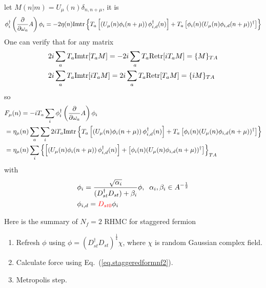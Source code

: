let $M(n|m)=U_{\mu}(n) \delta _{n,n+\mu}$, it is
\begin{equation}
\begin{split}
&\phi _i^{\dagger}\left(\frac{\partial }{\partial \omega _a}A\right)\phi _i = -2\eta (n) {\rm Imtr}\left\{T_a  \left[\left(U_{\mu}(n)\phi _i(n+\mu)\right)\phi _{i,d}^{\dagger}(n)\right]+T_a \left[\phi _i(n)(U_{\mu}(n)\phi _{i,d}(n+\mu))^{\dagger}\right]\right\}\\
\end{split}
\end{equation}
One can verify that for any matrix \textcolor[rgb]{0,0,1}{
\begin{equation}
\begin{split}
&2i \sum _a T_a {\rm Im tr}[T_a M] = -2 i \sum _a T_a {\rm Re tr}[i T_a M] = \{M\}_{TA}\\
&2i \sum _a T_a {\rm Im tr}[i T_a M] = 2 i \sum _a T_a {\rm Re tr}[T_a M] = \{i M\}_{TA}\\
\end{split}
\end{equation}
}
so
\begin{equation}
\begin{split}
&F_{\mu}(n)=-iT_a \sum _i \phi _{i}^{\dagger} \left(\frac{\partial }{\partial \omega _a} A \right) \phi _{i}\\
&=\eta _{\mu}(n) \sum _a \sum _i 2i T_a{\rm Imtr}\left\{T_a  \left[\left(U_{\mu}(n)\phi _i(n+\mu)\right)\phi _{i,d}^{\dagger}(n)\right]+T_a \left[\phi _i(n)(U_{\mu}(n)\phi _{i,d}(n+\mu))^{\dagger}\right]\right\}\\
&=\eta _{\mu}(n) \sum _i \left\{\left[\left(U_{\mu}(n)\phi _i(n+\mu)\right)\phi _{i,d}^{\dagger}(n)\right]+\left[\phi _i(n)(U_{\mu}(n)\phi _{i,d}(n+\mu))^{\dagger}\right]\right\}_{TA}
\end{split}
\label{eq.staggeredformnf2}
\end{equation}
with
\begin{equation}
\begin{split}
&\phi _i = \frac{\sqrt{\alpha _i} }{(D_{st}^{\dagger}D_{st})+\beta _i} \phi,\;\;\alpha _i,\beta _i \in A^{-\frac{1}{2}}\\
&\phi _{i,d}=\textcolor[rgb]{1,0,0}{D_{st0}}\phi _i\\
\end{split}
\end{equation}

Here is the summary of $N_f=2$ RHMC for staggered fermion
\begin{enumerate}
  \item Refresh $\phi$ using $\phi = (D_{st}^{\dagger}D_{st})^{\frac{1}{4}}\chi$, where $\chi$ is random Gaussian complex field.
  \item Calculate force using Eq.~(\ref{eq.staggeredformnf2}).
  \item Metropolis step.
\end{enumerate}

